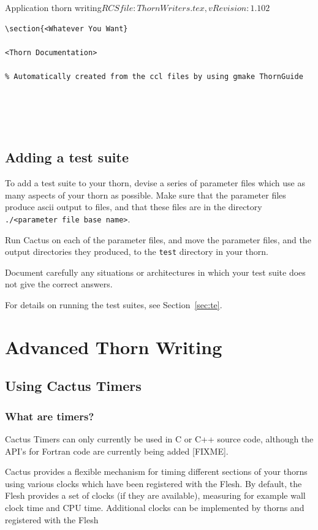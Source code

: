 \begin{cactuspart}{2}{Application thorn writing}{$RCSfile: ThornWriters.tex,v $}{$Revision: 1.102 $}
\begin{verbatim}
\section{<Whatever You Want}

<Thorn Documentation>

% Automatically created from the ccl files by using gmake ThornGuide





\end{verbatim}

\section{Adding a test suite}
\label{sec:adatesu}

To add a test suite to your thorn, devise a series of parameter
files which use as many aspects of your thorn as possible.
Make sure that the parameter files produce ascii output to files,
and that these files are in the directory
{\tt ./<parameter file base name>}.

Run Cactus on each of the parameter files, and move the parameter files,
and the output directories they produced, to the {\tt test} directory
in your thorn.

Document carefully any situations or architectures in which your test
suite does not give the correct answers.

For details on running the test suites, see Section~\ref{sec:te}.




\chapter{Advanced Thorn Writing}

\section{Using Cactus Timers}

\subsection{What are timers?}

Cactus Timers can only currently be used in C or C++ source code,
although the API's for Fortran code are currently being added [FIXME].

Cactus provides a flexible mechanism for
timing different sections of your thorns using various clocks which
have been registered with the Flesh.  By default, the Flesh provides a
set of clocks (if they are available), measuring for
example wall clock time and CPU time. Additional clocks can be
implemented by thorns and registered with the Flesh


\end{cactuspart}
